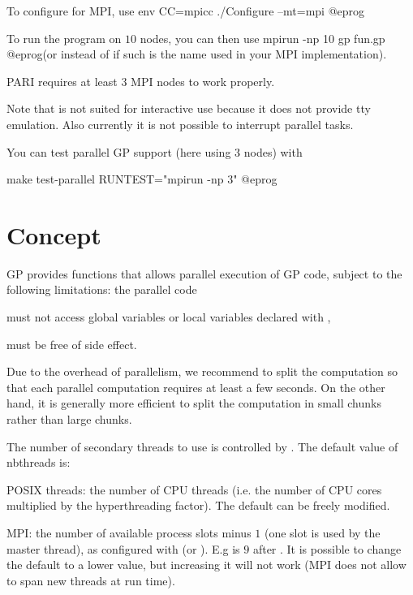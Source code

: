 To configure for MPI, use
\bprog
env CC=mpicc ./Configure --mt=mpi
@eprog

To run the program  on $10$ nodes, you can then use
\bprog
  mpirun -np 10 gp fun.gp
@eprog\noindent (or  instead of  if such is
the name used in your MPI implementation).

PARI requires at least $3$ MPI nodes to work properly.

Note that  is not suited for interactive use because it
does not provide tty emulation. Also currently it is not possible to
interrupt parallel tasks.

You can test parallel GP support (here using 3 nodes) with

\bprog
make test-parallel RUNTEST="mpirun -np 3"
@eprog

\section{Concept}

GP provides functions that allows parallel execution of GP code, subject to
the following limitations: the parallel code

\item must not access global variables or local variables declared with
  ,

\item must be free of side effect.

Due to the overhead of parallelism, we recommend to split the computation so
that each parallel computation requires at least a few seconds. On the other
hand, it is generally more efficient to split the computation in small chunks
rather than large chunks.


The number of secondary threads to use is controlled by
. The default value of nbthreads is:

\item POSIX threads: the number of CPU threads (i.e. the number of CPU cores
multiplied by the hyperthreading factor).
The default can be freely modified.

\item MPI: the number of available process slots minus $1$ (one slot is used by
the master thread), as configured with  (or ). E.g
 is $9$ after .
It is possible to change the default to a lower value, but increasing it will
not work (MPI does not allow to span new threads at run time).

